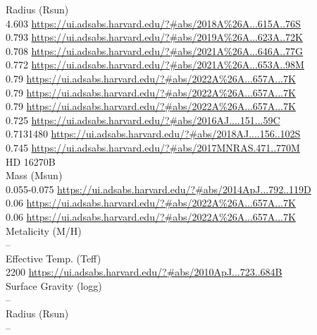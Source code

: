 Radius (Rsun)\\
4.603 \url{https://ui.adsabs.harvard.edu/?#abs/2018A%26A...615A..76S}\\
0.793 \url{https://ui.adsabs.harvard.edu/?#abs/2019A%26A...623A..72K}\\
0.708 \url{https://ui.adsabs.harvard.edu/?#abs/2021A%26A...646A..77G}\\
0.772 \url{https://ui.adsabs.harvard.edu/?#abs/2021A%26A...653A..98M}\\
0.79 \url{https://ui.adsabs.harvard.edu/?#abs/2022A%26A...657A...7K}\\
0.79 \url{https://ui.adsabs.harvard.edu/?#abs/2022A%26A...657A...7K}\\
0.79 \url{https://ui.adsabs.harvard.edu/?#abs/2022A%26A...657A...7K}\\
0.725 \url{https://ui.adsabs.harvard.edu/?#abs/2016AJ....151...59C}\\
0.7131480 \url{https://ui.adsabs.harvard.edu/?#abs/2018AJ....156..102S}\\
0.745 \url{https://ui.adsabs.harvard.edu/?#abs/2017MNRAS.471..770M}\\

HD 16270B\\
Mass (Msun)\\
0.055-0.075 \url{https://ui.adsabs.harvard.edu/?#abs/2014ApJ...792..119D}\\
0.06 \url{https://ui.adsabs.harvard.edu/?#abs/2022A%26A...657A...7K}\\
0.06 \url{https://ui.adsabs.harvard.edu/?#abs/2022A%26A...657A...7K}\\

Metalicity (M/H)\\
--\\
Effective Temp. (Teff)\\

2200 \url{https://ui.adsabs.harvard.edu/?#abs/2010ApJ...723..684B}\\

Surface Gravity (logg)\\
--\\

Radius (Rsun)\\
--\\